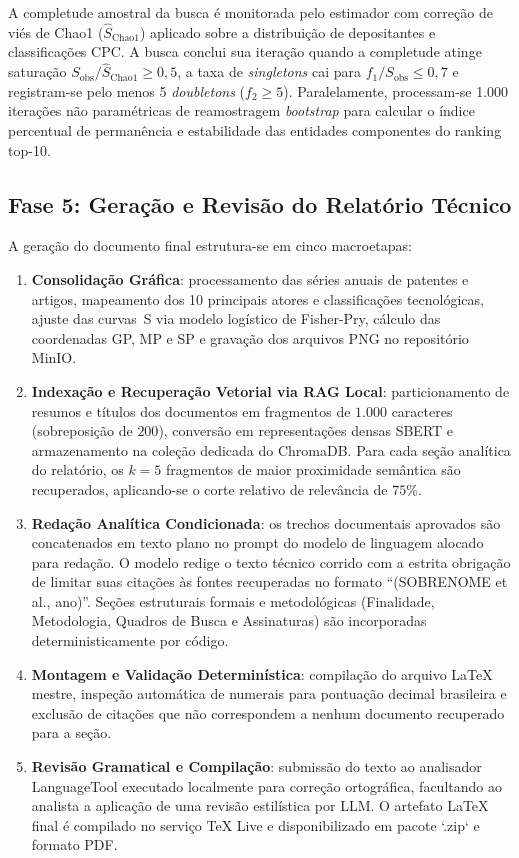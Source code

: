 \documentclass[12pt, a4paper]{article}
\begin{document}
  A completude amostral da busca é monitorada pelo estimador com correção de viés de Chao1 ($\hat{S}_{\text{Chao1}}$) aplicado sobre a distribuição de depositantes e classificações CPC. A busca conclui sua iteração quando a completude atinge saturação $S_{\text{obs}} / \hat{S}_{\text{Chao1}} \ge 0{,}5$, a taxa de \textit{singletons} cai para $f_1 / S_{\text{obs}} \le 0{,}7$ e registram-se pelo menos 5 \textit{doubletons} ($f_2 \ge 5$). Paralelamente, processam-se 1.000 iterações não paramétricas de reamostragem \textit{bootstrap} para calcular o índice percentual de permanência e estabilidade das entidades componentes do ranking top-10.

  \subsection{Fase 5: Geração e Revisão do Relatório Técnico}
  \label{sec:fase5}

  A geração do documento final estrutura-se em cinco macroetapas:
  \begin{enumerate}
    \item \textbf{Consolidação Gráfica}: processamento das séries anuais de patentes e artigos, mapeamento dos 10 principais atores e classificações tecnológicas, ajuste das curvas~S via modelo logístico de Fisher-Pry, cálculo das coordenadas GP, MP e SP e gravação dos arquivos PNG no repositório MinIO.
    \item \textbf{Indexação e Recuperação Vetorial via RAG Local}: particionamento de resumos e títulos dos documentos em fragmentos de $1.000$ caracteres (sobreposição de $200$), conversão em representações densas SBERT e armazenamento na coleção dedicada do ChromaDB. Para cada seção analítica do relatório, os $k=5$ fragmentos de maior proximidade semântica são recuperados, aplicando-se o corte relativo de relevância de $75\%$.
    \item \textbf{Redação Analítica Condicionada}: os trechos documentais aprovados são concatenados em texto plano no prompt do modelo de linguagem alocado para redação. O modelo redige o texto técnico corrido com a estrita obrigação de limitar suas citações às fontes recuperadas no formato ``(SOBRENOME et al., ano)''. Seções estruturais formais e metodológicas (Finalidade, Metodologia, Quadros de Busca e Assinaturas) são incorporadas deterministicamente por código.
    \item \textbf{Montagem e Validação Determinística}: compilação do arquivo LaTeX mestre, inspeção automática de numerais para pontuação decimal brasileira e exclusão de citações que não correspondem a nenhum documento recuperado para a seção.
    \item \textbf{Revisão Gramatical e Compilação}: submissão do texto ao analisador LanguageTool executado localmente para correção ortográfica, facultando ao analista a aplicação de uma revisão estilística por LLM. O artefato LaTeX final é compilado no serviço TeX Live e disponibilizado em pacote `.zip` e formato PDF.
  \end{enumerate}
\end{document}
